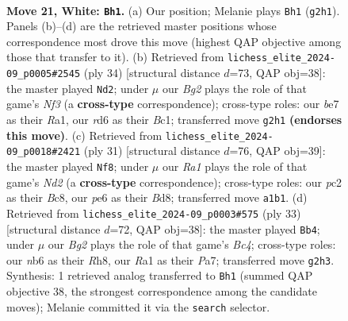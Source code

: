 \documentclass[11pt]{article}
\begin{document}
\clearpage

\begin{figure}[p]\centering
\begin{subfigure}{0.46\textwidth}\centering
\resizebox{\linewidth}{!}{%
\newchessgame
\chessboard[
  setfen={rnb3k1/1p2bp2/pn1rp1p1/7p/8/1P2P1P1/P1pNP1BP/R1B1RK2 w - - 0 21},
  showmover=false,
  pgfstyle=straightmove, color=movearrow, markmove={g2-h1}
]}
\caption{}
\end{subfigure}\hfill
\begin{subfigure}{0.46\textwidth}\centering
\resizebox{\linewidth}{!}{%
\newchessgame
\chessboard[
  setfen={r3r1k1/ppp3b1/2n3pp/4p3/P7/2Pb1NP1/5PBP/R1B1R1K1 w - - 0 18},
  showmover=false,
  pgfstyle=straightmove, color=movearrow, markmove={f3-d2}
]}
\caption{}
\end{subfigure}
\\[4pt]
\begin{subfigure}{0.46\textwidth}\centering
\resizebox{\linewidth}{!}{%
\newchessgame
\chessboard[
  setfen={r1bbr1k1/pp1n1ppp/2p5/3p4/3P2PP/1PP1NP2/1P3K2/R1B3NR b - - 2 16},
  showmover=false,
  pgfstyle=straightmove, color=movearrow, markmove={d7-f8}
]}
\caption{}
\end{subfigure}\hfill
\begin{subfigure}{0.46\textwidth}\centering
\resizebox{\linewidth}{!}{%
\newchessgame
\chessboard[
  setfen={2r2k1r/pp1p1pp1/4pn2/2b4p/4PB2/2N2P2/PPPR1P1P/5RK1 b - - 0 17},
  showmover=false,
  pgfstyle=straightmove, color=movearrow, markmove={c5-b4}
]}
\caption{}
\end{subfigure}
\caption{\textbf{Move 21, White: \texttt{Bh1}.} (a) Our position; Melanie plays \texttt{Bh1} (\texttt{g2h1}). Panels (b)--(d) are the retrieved master positions whose correspondence most drove this move (highest QAP objective among those that transfer to it). (b) Retrieved from \texttt{lichess\_elite\_2024-09\_p0005\#2545} (ply 34) [structural distance $d$=73, QAP obj=38]: the master played \texttt{Nd2}; under $\mu$ our \emph{Bg2} plays the role of that game's \emph{Nf3} (a \textbf{cross-type} correspondence); cross-type roles: our \emph{b}e7 as their \emph{R}a1, our \emph{r}d6 as their \emph{B}c1; transferred move \texttt{g2h1} \textbf{(endorses this move)}. (c) Retrieved from \texttt{lichess\_elite\_2024-09\_p0018\#2421} (ply 31) [structural distance $d$=76, QAP obj=39]: the master played \texttt{Nf8}; under $\mu$ our \emph{Ra1} plays the role of that game's \emph{Nd2} (a \textbf{cross-type} correspondence); cross-type roles: our \emph{p}c2 as their \emph{B}c8, our \emph{p}e6 as their \emph{B}d8; transferred move \texttt{a1b1}. (d) Retrieved from \texttt{lichess\_elite\_2024-09\_p0003\#575} (ply 33) [structural distance $d$=72, QAP obj=38]: the master played \texttt{Bb4}; under $\mu$ our \emph{Bg2} plays the role of that game's \emph{Bc4}; cross-type roles: our \emph{n}b6 as their \emph{R}h8, our \emph{R}a1 as their \emph{P}a7; transferred move \texttt{g2h3}. Synthesis: 1 retrieved analog transferred to \texttt{Bh1} (summed QAP objective 38, the strongest correspondence among the candidate moves); Melanie committed it via the \texttt{search} selector.}
\label{fig:thought-m40}
\end{figure}
\end{document}
